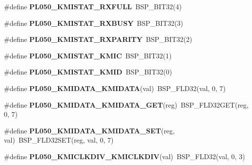 \begin{DoxyCompactItemize}
\#define {\bfseries P\+L050\+\_\+\+K\+M\+I\+S\+T\+A\+T\+\_\+\+R\+X\+F\+U\+LL}~B\+S\+P\+\_\+\+B\+I\+T32(4)
\item 
\mbox{\label{arm-pl050-regs_8h_a7577080a37d96d42645333d9c4da000f}} 
\#define {\bfseries P\+L050\+\_\+\+K\+M\+I\+S\+T\+A\+T\+\_\+\+R\+X\+B\+U\+SY}~B\+S\+P\+\_\+\+B\+I\+T32(3)
\item 
\mbox{\label{arm-pl050-regs_8h_a858824b1b89f91e2ee347c094fd1da12}} 
\#define {\bfseries P\+L050\+\_\+\+K\+M\+I\+S\+T\+A\+T\+\_\+\+R\+X\+P\+A\+R\+I\+TY}~B\+S\+P\+\_\+\+B\+I\+T32(2)
\item 
\mbox{\label{arm-pl050-regs_8h_a3759d5297bdce094615d6a342f1d910d}} 
\#define {\bfseries P\+L050\+\_\+\+K\+M\+I\+S\+T\+A\+T\+\_\+\+K\+M\+IC}~B\+S\+P\+\_\+\+B\+I\+T32(1)
\item 
\mbox{\label{arm-pl050-regs_8h_a6a5bc8c2bd61e2fe7dc2d47127e526fc}} 
\#define {\bfseries P\+L050\+\_\+\+K\+M\+I\+S\+T\+A\+T\+\_\+\+K\+M\+ID}~B\+S\+P\+\_\+\+B\+I\+T32(0)
\item 
\mbox{\label{arm-pl050-regs_8h_a797470780765b6aeb27247b2ba2da709}} 
\#define {\bfseries P\+L050\+\_\+\+K\+M\+I\+D\+A\+T\+A\+\_\+\+K\+M\+I\+D\+A\+TA}(val)~B\+S\+P\+\_\+\+F\+L\+D32(val, 0, 7)
\item 
\mbox{\label{arm-pl050-regs_8h_ad22f5a5aafc4f4c9786003f7147e023a}} 
\#define {\bfseries P\+L050\+\_\+\+K\+M\+I\+D\+A\+T\+A\+\_\+\+K\+M\+I\+D\+A\+T\+A\+\_\+\+G\+ET}(reg)~B\+S\+P\+\_\+\+F\+L\+D32\+G\+ET(reg, 0, 7)
\item 
\mbox{\label{arm-pl050-regs_8h_ab42dafa2859aef83ab11926028a26e3c}} 
\#define {\bfseries P\+L050\+\_\+\+K\+M\+I\+D\+A\+T\+A\+\_\+\+K\+M\+I\+D\+A\+T\+A\+\_\+\+S\+ET}(reg,  val)~B\+S\+P\+\_\+\+F\+L\+D32\+S\+ET(reg, val, 0, 7)
\item 
\mbox{\label{arm-pl050-regs_8h_a5d7e74b73d31e2f760e720162869fa73}} 
\#define {\bfseries P\+L050\+\_\+\+K\+M\+I\+C\+L\+K\+D\+I\+V\+\_\+\+K\+M\+I\+C\+L\+K\+D\+IV}(val)~B\+S\+P\+\_\+\+F\+L\+D32(val, 0, 3)
\item 
\mbox{\label{arm-pl050-regs_8h_a0d77942bb802bdf7d7005f195ca9578c}} 

\end{DoxyCompactItemize}
